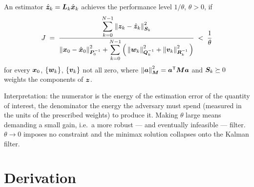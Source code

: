 \begin{definition}\label{def:hi-crit}
An estimator $\hat{\bm{z}}_k=\bm{L}_k\hat{\bm{x}}_k$ achieves the performance level $1/\theta$, $\theta>0$, if
\begin{equation}
J \;=\;
\frac{\displaystyle\sum_{k=0}^{N-1}\left\lVert \bm{z}_k-\hat{\bm{z}}_k \right\rVert^2_{\bm{S}_k}}
     {\displaystyle\left\lVert \bm{x}_0-\hat{\bm{x}}_0 \right\rVert^2_{\bm{P}_0^{-1}}
      +\sum_{k=0}^{N-1}\Big(\left\lVert \bm{w}_k \right\rVert^2_{\bm{Q}_k^{-1}}+\left\lVert \bm{v}_k \right\rVert^2_{\bm{R}_k^{-1}}\Big)}
\;<\;\frac{1}{\theta}
\label{eq:hi-J}
\end{equation}
for every $\bm{x}_0$, $\{\bm{w}_k\}$, $\{\bm{v}_k\}$ not all zero, where
$\left\lVert \bm{a} \right\rVert^2_{\bm{M}}=\bm{a}^{\mathsf{T}}\bm{M}\bm{a}$ and $\bm{S}_k\succeq0$ weights the components of $\bm{z}$.
\end{definition}

Interpretation: the numerator is the energy of the estimation error of the quantity of interest,
the denominator the energy the adversary must spend (measured in the units of the prescribed
weights) to produce it.  Making $\theta$ large means demanding a small gain, i.e.\ a more robust
--- and eventually infeasible --- filter.  $\theta\to0$ imposes no constraint and the minimax
solution collapses onto the Kalman filter.

\section{Derivation}

